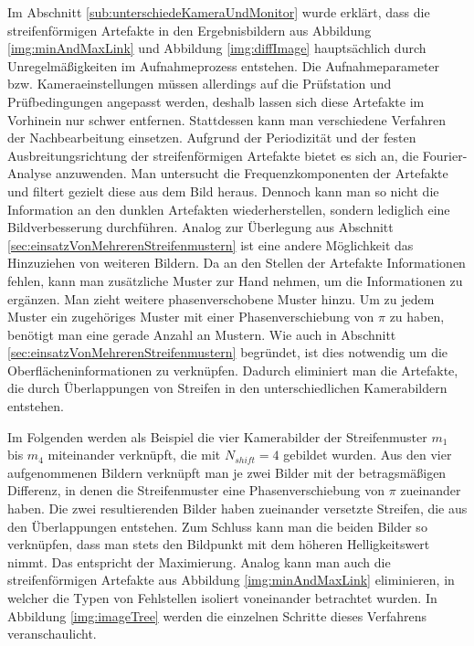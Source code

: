 Im Abschnitt \ref{sub:unterschiedeKameraUndMonitor} wurde erklärt, dass die streifenförmigen Artefakte in den Ergebnisbildern aus Abbildung \ref{img:minAndMaxLink} und Abbildung \ref{img:diffImage} hauptsächlich durch Unregelmäßigkeiten im Aufnahmeprozess entstehen.
Die Aufnahmeparameter bzw. Kameraeinstellungen müssen allerdings auf die Prüfstation und Prüfbedingungen angepasst werden, deshalb lassen sich diese Artefakte im Vorhinein nur schwer entfernen.
Stattdessen kann man verschiedene Verfahren der Nachbearbeitung einsetzen.
Aufgrund der Periodizität und der festen Ausbreitungsrichtung der streifenförmigen Artefakte bietet es sich an, die Fourier-Analyse anzuwenden.
Man untersucht die Frequenzkomponenten der Artefakte und filtert gezielt diese aus dem Bild heraus.
Dennoch kann man so nicht die Information an den dunklen Artefakten wiederherstellen, sondern lediglich eine Bildverbesserung durchführen.
Analog zur Überlegung aus Abschnitt \ref{sec:einsatzVonMehrerenStreifenmustern} ist eine andere Möglichkeit das Hinzuziehen von weiteren Bildern.
Da an den Stellen der Artefakte Informationen fehlen, kann man zusätzliche Muster zur Hand nehmen, um die Informationen zu ergänzen.
Man zieht weitere phasenverschobene Muster hinzu.
Um zu jedem Muster ein zugehöriges Muster mit einer Phasenverschiebung von $\pi$ zu haben, benötigt man eine gerade Anzahl an Mustern.
Wie auch in Abschnitt \ref{sec:einsatzVonMehrerenStreifenmustern} begründet, ist dies notwendig um die Oberflächeninformationen zu verknüpfen.
Dadurch eliminiert man die Artefakte, die durch Überlappungen von Streifen in den unterschiedlichen Kamerabildern entstehen.

\p
Im Folgenden werden als Beispiel die vier Kamerabilder der Streifenmuster $m_1$ bis $m_4$ miteinander verknüpft, die mit $N_{shift} = 4$ gebildet wurden.
Aus den vier aufgenommenen Bildern verknüpft man je zwei Bilder mit der betragsmäßigen Differenz, in denen die Streifenmuster eine Phasenverschiebung von $\pi$ zueinander haben.
Die zwei resultierenden Bilder haben zueinander versetzte Streifen, die aus den Überlappungen entstehen.
Zum Schluss kann man die beiden Bilder so verknüpfen, dass man stets den Bildpunkt mit dem höheren Helligkeitswert nimmt.
Das entspricht der Maximierung.
Analog kann man auch die streifenförmigen Artefakte aus Abbildung \ref{img:minAndMaxLink} eliminieren, in welcher die Typen von Fehlstellen isoliert voneinander betrachtet wurden.
In Abbildung \ref{img:imageTree} werden die einzelnen Schritte dieses Verfahrens veranschaulicht.

